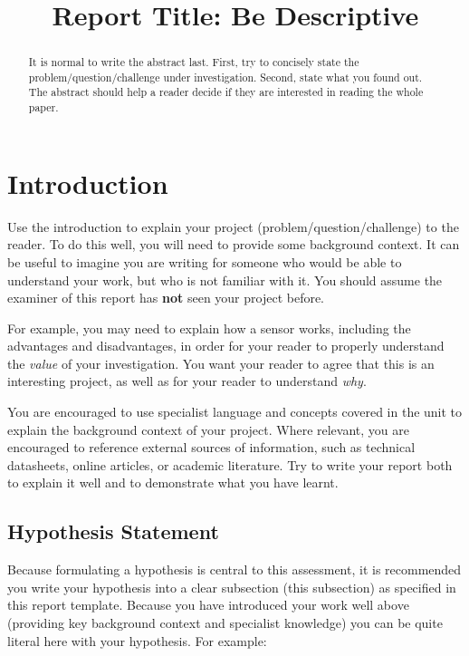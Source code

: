 \documentclass[conference]{IEEEtran}
\begin{document}
\title{Report Title: Be Descriptive}

\author{
    \and
}

\maketitle

\begin{abstract}
It is normal to write the abstract last.  First, try to concisely state the problem/question/challenge under investigation.  Second, state what you found out.  The abstract should help a reader decide if they are interested in reading the whole paper.  
\end{abstract}


\section{Introduction}
Use the introduction to explain your project (problem/question/challenge) to the reader.  To do this well, you will need to provide some background context.  It can be useful to imagine you are writing for someone who would be able to understand your work, but who is not familiar with it.  You should assume the examiner of this report has \textbf{not} seen your project before.   

For example, you may need to explain how a sensor works, including the advantages and disadvantages, in order for your reader to properly understand the \emph{value} of your investigation.  You want your reader to agree that this is an interesting project, as well as for your reader to understand \emph{why}. 

You are encouraged to use specialist language and concepts covered in the unit to explain the background context of your project.  Where relevant, you are encouraged to reference external sources of information, such as technical datasheets, online articles\cite{picard2001toward}\cite{beck2010towards}, or academic literature.  Try to write your report both to explain it well and to demonstrate what you have learnt.

\subsection{Hypothesis Statement}

Because formulating a hypothesis is central to this assessment, it is recommended you write your hypothesis into a clear subsection (this subsection) as specified in this report template.  Because you have introduced your work well above (providing key background context and specialist knowledge) you can be quite literal here with your hypothesis.  For example: 
\end{document}
